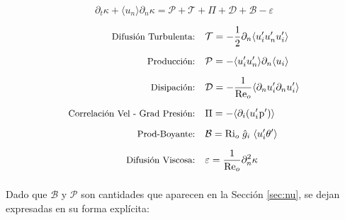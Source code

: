 \begin{equation}
\partial_t \kappa + \langle u_n \rangle \partial_n \kappa = \mathcal{P} + \mathcal{T} + \Pi + \mathcal{D} + \mathcal{B} - \varepsilon
\label{eq:tke-bud}
\end{equation}

\vspace*{-0.5cm}

\begin{equation}
\begin{aligned}
\mbox{\small Difusión Turbulenta:}\quad 
& \mathcal{T} = - \frac{1}{2} \partial_n \langle u'_i u'_n u'_i \rangle \\[2mm]
\mbox{\small Producción:}\quad 
& \mathcal{P} = - \langle u'_i u'_n \rangle \partial_n \langle u_i \rangle \\[2mm]
\mbox{\small Disipación:}\quad 
& \mathcal{D} = - \frac{1}{\text{Re}_o} \langle \partial_n u'_i \partial_n u'_i \rangle \\[2mm]
\mbox{\small Correlación Vel - Grad Presión:}\quad 
& \Pi = - \langle \partial_i (u'_i \hspace{0.1mm} \text{p}') \rangle \\[2mm]
\mbox{\small Prod-Boyante:}\quad 
& \mathcal{B} = \text{Ri}_o \hspace{1mm} \hat{g}_i \hspace{1mm} \langle u'_i \theta' \rangle \\[2mm]
\mbox{\small Difusión Viscosa:}\quad 
& \varepsilon = \frac{1}{\text{Re}_o} \partial^2_n \kappa \\[2mm]
\end{aligned}
\end{equation}

Dado que $\mathcal{B}$ y $\mathcal{P}$ son cantidades que aparecen en la Sección \ref{sec:nu}, se dejan expresadas en su forma explícita:

